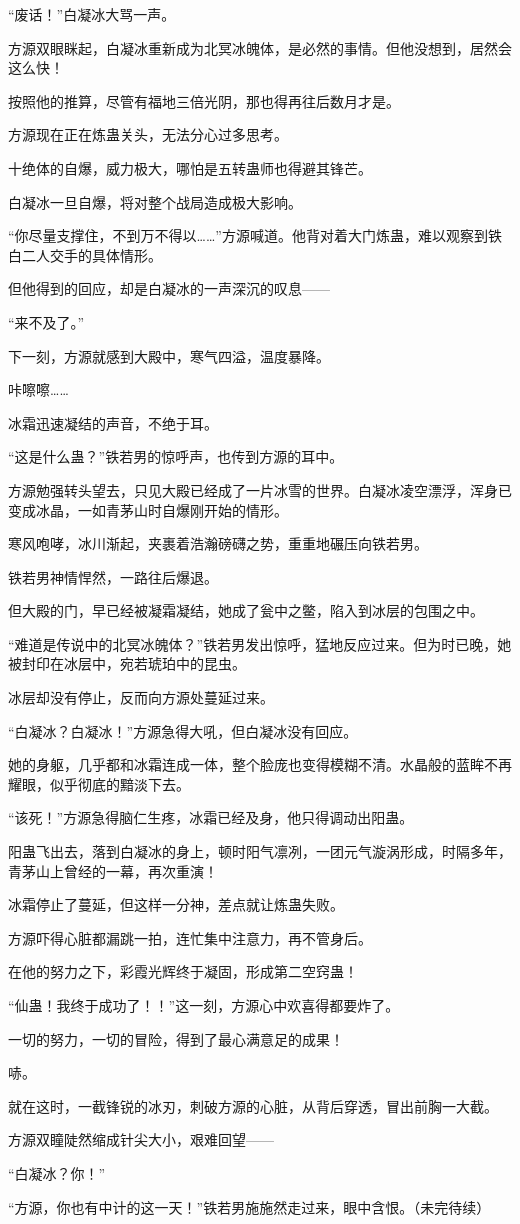 \begin{this_body}
“废话！”白凝冰大骂一声。

方源双眼眯起，白凝冰重新成为北冥冰魄体，是必然的事情。但他没想到，居然会这么快！

按照他的推算，尽管有福地三倍光阴，那也得再往后数月才是。

方源现在正在炼蛊关头，无法分心过多思考。

十绝体的自爆，威力极大，哪怕是五转蛊师也得避其锋芒。

白凝冰一旦自爆，将对整个战局造成极大影响。

“你尽量支撑住，不到万不得以……”方源喊道。他背对着大门炼蛊，难以观察到铁白二人交手的具体情形。

但他得到的回应，却是白凝冰的一声深沉的叹息——

“来不及了。”

下一刻，方源就感到大殿中，寒气四溢，温度暴降。

咔嚓嚓……

冰霜迅速凝结的声音，不绝于耳。

“这是什么蛊？”铁若男的惊呼声，也传到方源的耳中。

方源勉强转头望去，只见大殿已经成了一片冰雪的世界。白凝冰凌空漂浮，浑身已变成冰晶，一如青茅山时自爆刚开始的情形。

寒风咆哮，冰川渐起，夹裹着浩瀚磅礴之势，重重地碾压向铁若男。

铁若男神情悍然，一路往后爆退。

但大殿的门，早已经被凝霜凝结，她成了瓮中之鳖，陷入到冰层的包围之中。

“难道是传说中的北冥冰魄体？”铁若男发出惊呼，猛地反应过来。但为时已晚，她被封印在冰层中，宛若琥珀中的昆虫。

冰层却没有停止，反而向方源处蔓延过来。

“白凝冰？白凝冰！”方源急得大吼，但白凝冰没有回应。

她的身躯，几乎都和冰霜连成一体，整个脸庞也变得模糊不清。水晶般的蓝眸不再耀眼，似乎彻底的黯淡下去。

“该死！”方源急得脑仁生疼，冰霜已经及身，他只得调动出阳蛊。

阳蛊飞出去，落到白凝冰的身上，顿时阳气凛冽，一团元气漩涡形成，时隔多年，青茅山上曾经的一幕，再次重演！

冰霜停止了蔓延，但这样一分神，差点就让炼蛊失败。

方源吓得心脏都漏跳一拍，连忙集中注意力，再不管身后。

在他的努力之下，彩霞光辉终于凝固，形成第二空窍蛊！

“仙蛊！我终于成功了！！”这一刻，方源心中欢喜得都要炸了。

一切的努力，一切的冒险，得到了最心满意足的成果！

哧。

就在这时，一截锋锐的冰刃，刺破方源的心脏，从背后穿透，冒出前胸一大截。

方源双瞳陡然缩成针尖大小，艰难回望——

“白凝冰？你！”

“方源，你也有中计的这一天！”铁若男施施然走过来，眼中含恨。（未完待续）

\end{this_body}

